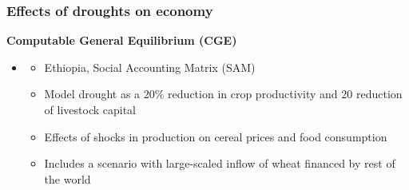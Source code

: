 \documentclass{beamer}              %
\begin{document}
\begin{frame}

\frametitle{Effects of droughts on economy}\label{Effects} 
\begin{block}{\textbf{Computable General Equilibrium (CGE)}}

\begin{itemize}
\item \underline{\textbf{\cite{robinson2010}}}
\begin{itemize}
\item Ethiopia, Social Accounting Matrix (SAM)

\item Model drought as a $20\%$ reduction in crop productivity and $20$ reduction of livestock capital
\item Effects of shocks in production on cereal prices and food consumption
\item Includes a scenario with large-scaled inflow of wheat financed by rest of the world
\end{itemize}
\end{itemize}
\end{block}
\end{frame}


\end{document}
